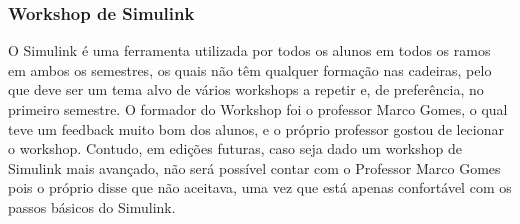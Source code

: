 
\subsubsection{Workshop de Simulink}

O Simulink é uma ferramenta utilizada por todos os alunos em todos os ramos em ambos os semestres, os quais não têm qualquer formação nas cadeiras, pelo que deve ser um tema alvo de vários workshops a repetir e, de preferência, no primeiro semestre. O formador do Workshop foi o professor Marco Gomes, o qual teve um feedback muito bom dos alunos, e o próprio professor gostou de lecionar o workshop. Contudo, em edições futuras, caso seja dado um workshop de Simulink mais avançado, não será possível contar com o Professor Marco Gomes pois o próprio disse que não aceitava, uma vez que está apenas confortável com os passos básicos do Simulink.